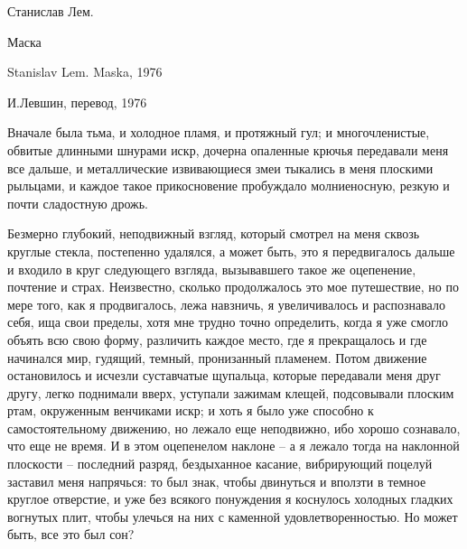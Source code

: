 
Станислав Лем.

Маска



Stanislav Lem. Maska, 1976

И.Левшин, перевод, 1976


Вначале была тьма, и холодное пламя, и протяжный гул; и многочленистые,
обвитые  длинными шнурами искр, дочерна опаленные крючья передавали меня все
дальше, и металлические извивающиеся змеи тыкались в меня плоскими рыльцами,
и  каждое  такое  прикосновение  пробуждало  молниеносную,  резкую  и  почти
сладостную дрожь.

Безмерно  глубокий,  неподвижный взгляд, который смотрел на меня сквозь
круглые стекла, постепенно удалялся,  а  может  быть,  это  я  передвигалось
дальше и входило в круг следующего взгляда, вызывавшего такое же оцепенение,
почтение  и  страх. Неизвестно, сколько продолжалось это мое путешествие, но
по  мере  того,  как  я  продвигалось,  лежа  навзничь,  я  увеличивалось  и
распознавало себя, ища свои пределы, хотя мне трудно точно определить, когда
я  уже  смогло  объять  всю  свою  форму,  различить  каждое  место,  где  я
прекращалось и где начинался мир,  гудящий,  темный,  пронизанный  пламенем.
Потом   движение   остановилось  и  исчезли  суставчатые  щупальца,  которые
передавали меня друг другу, легко поднимали вверх, уступали зажимам  клещей,
подсовывали  плоским  ртам,  окруженным  венчиками  искр;  и хоть я было уже
способно к самостоятельному движению, но лежало еще неподвижно,  ибо  хорошо
сознавало, что еще не время. И в этом оцепенелом наклоне -- а я лежало тогда
на наклонной плоскости -- последний разряд, бездыханное касание, вибрирующий
поцелуй  заставил  меня  напрячься: то был знак, чтобы двинуться и вползти в
темное круглое отверстие, и уже без всякого понуждения я коснулось  холодных
гладких  вогнутых  плит, чтобы улечься на них с каменной удовлетворенностью.
Но может быть, все это был сон?

